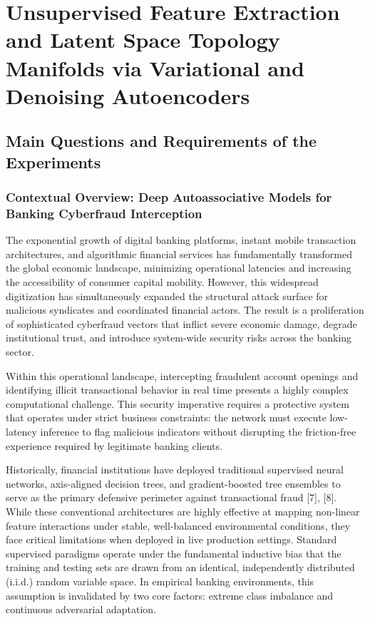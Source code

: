 \documentclass[11pt,a4paper]{report}
\begin{document}
\chapter{Unsupervised Feature Extraction and Latent Space Topology Manifolds via Variational and Denoising Autoencoders}

\section{Main Questions and Requirements of the Experiments}

\subsection{Contextual Overview: Deep Autoassociative Models for Banking Cyberfraud Interception}
The exponential growth of digital banking platforms, instant mobile transaction architectures, and algorithmic financial services has fundamentally transformed the global economic landscape, minimizing operational latencies and increasing the accessibility of consumer capital mobility. However, this widespread digitization has simultaneously expanded the structural attack surface for malicious syndicates and coordinated financial actors. The result is a proliferation of sophisticated cyberfraud vectors that inflict severe economic damage, degrade institutional trust, and introduce system-wide security risks across the banking sector. 

Within this operational landscape, intercepting fraudulent account openings and identifying illicit transactional behavior in real time presents a highly complex computational challenge. This security imperative requires a protective system that operates under strict business constraints: the network must execute low-latency inference to flag malicious indicators without disrupting the friction-free experience required by legitimate banking clients. 

Historically, financial institutions have deployed traditional supervised neural networks, axis-aligned decision trees, and gradient-boosted tree ensembles to serve as the primary defensive perimeter against transactional fraud [7], [8]. While these conventional architectures are highly effective at mapping non-linear feature interactions under stable, well-balanced environmental conditions, they face critical limitations when deployed in live production settings. Standard supervised paradigms operate under the fundamental inductive bias that the training and testing sets are drawn from an identical, independently distributed (i.i.d.) random variable space. In empirical banking environments, this assumption is invalidated by two core factors: extreme class imbalance and continuous adversarial adaptation. 
\end{document}
